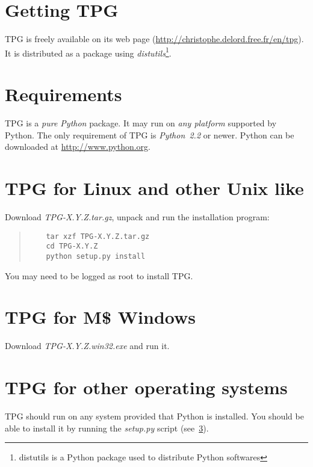 
\section{Getting TPG}

TPG is freely available on its web page (\url{http://christophe.delord.free.fr/en/tpg}). It is distributed as a package using \emph{distutils}\footnote{distutils is a Python package used to distribute Python softwares}.

\section{Requirements}

TPG is a \emph{pure Python} package.
It may run on \emph{any platform} supported by Python.
The only requirement of TPG is \emph{Python~2.2} or newer. Python can be downloaded at \url{http://www.python.org}.

\section{TPG for Linux and other Unix like}					\label{linux_install}

Download \mbox{\emph{TPG-X.Y.Z.tar.gz}}, unpack and run the installation program:
\begin{quote}
\begin{verbatim}
	tar xzf TPG-X.Y.Z.tar.gz
	cd TPG-X.Y.Z
	python setup.py install
\end{verbatim}
\end{quote}
You may need to be logged as root to install TPG.

\section{TPG for M\$ Windows}

Download \mbox{\emph{TPG-X.Y.Z.win32.exe}} and run it.

\section{TPG for other operating systems}

TPG should run on any system provided that Python is installed. You should be able to install it by running the \mbox{\emph{setup.py}} script (see~\ref{linux_install}).
